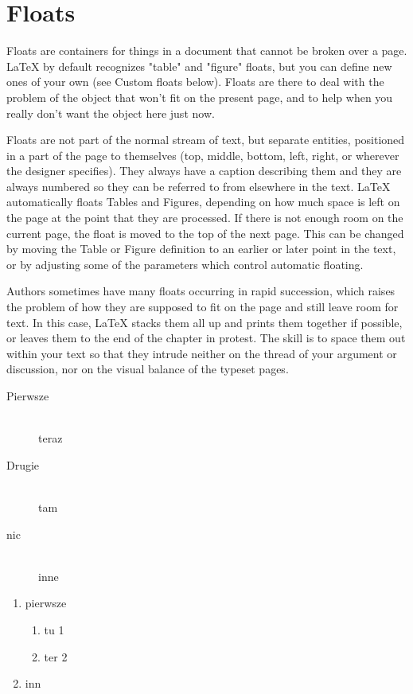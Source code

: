 \documentclass[a4paper,11pt]{article}
\begin{document}
\section{Floats}
Floats are containers for things in a document that cannot be broken over a page. LaTeX by default recognizes "table" and "figure" floats, but you can define new ones of your own (see Custom floats below). Floats are there to deal with the problem of the object that won't fit on the present page, and to help when you really don't want the object here just now.

Floats are not part of the normal stream of text, but separate entities, positioned in a part of the page to themselves (top, middle, bottom, left, right, or wherever the designer specifies). They always have a caption describing them and they are always numbered so they can be referred to from elsewhere in the text. LaTeX automatically floats Tables and Figures, depending on how much space is left on the page at the point that they are processed. If there is not enough room on the current page, the float is moved to the top of the next page. This can be changed by moving the Table or Figure definition to an earlier or later point in the text, or by adjusting some of the parameters which control automatic floating.

Authors sometimes have many floats occurring in rapid succession, which raises the problem of how they are supposed to fit on the page and still leave room for text. In this case, LaTeX stacks them all up and prints them together if possible, or leaves them to the end of the chapter in protest. The skill is to space them out within your text so that they intrude neither on the thread of your argument or discussion, nor on the visual balance of the typeset pages.

\begin{description}
  \item[Pierwsze] \hfill \\
  teraz
  \item[Drugie] \hfill \\
  tam
  \item[nic] \hfill \\
  inne
\end{description}

\begin{enumerate}
  \item pierwsze
  \begin{enumerate}
    \item tu 1
    \item ter 2
  \end{enumerate}
  \item inn
\end{enumerate}
\end{document}
